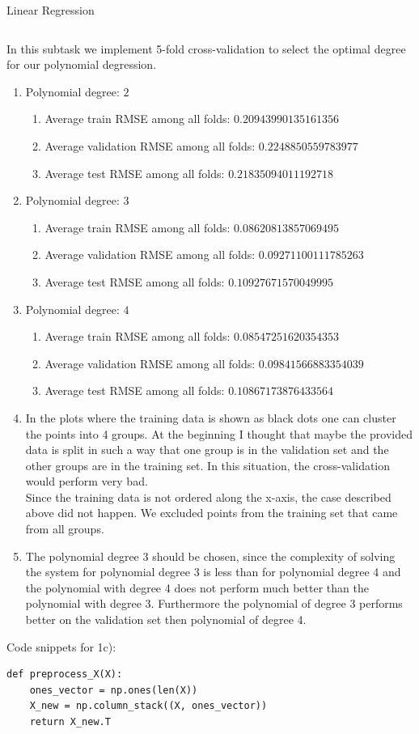 \begin{task}{Linear Regression}
\begin{subtask}
\begin{lstlisting}
\end{lstlisting}
\end{subtask}
\begin{subtask}
In this subtask we implement 5-fold cross-validation to select the optimal degree for our polynomial degression.
\begin{enumerate}
\item Polynomial degree: $2$
\begin{enumerate}
\item Average train RMSE among all folds: $0.20943990135161356$
\item Average validation RMSE among all folds: $0.2248850559783977$
\item Average test RMSE among all folds: $0.21835094011192718$
\end{enumerate}
\item Polynomial degree: $3$
\begin{enumerate}
\item Average train RMSE among all folds: $0.08620813857069495$
\item Average validation RMSE among all folds: $0.09271100111785263$
\item Average test RMSE among all folds: $0.10927671570049995$
\end{enumerate}
\item Polynomial degree: $4$
\begin{enumerate}
\item Average train RMSE among all folds: $0.08547251620354353$
\item Average validation RMSE among all folds: $0.09841566883354039$
\item Average test RMSE among all folds: $0.10867173876433564$
\end{enumerate}
\item In the plots where the training data is shown as black dots one can cluster the points into 4 groups. At the beginning I thought that maybe the provided data is split in such a way that one group is in the validation set and the other groups are in the training set. In this situation, the cross-validation would perform very bad. \\
Since the training data is not ordered along the x-axis, the case described above did not happen. We excluded points from the training set that came from all groups. 
\item The polynomial degree 3 should be chosen, since the complexity of solving the system for polynomial degree 3 is less than for polynomial degree 4 and the polynomial with degree 4 does not perform much better than the polynomial with degree 3. Furthermore the polynomial of degree 3 performs better on the validation set then polynomial of degree 4. 
\end{enumerate}
Code snippets for 1c):
\begin{lstlisting}
def preprocess_X(X):
    ones_vector = np.ones(len(X))
    X_new = np.column_stack((X, ones_vector))
    return X_new.T


\end{lstlisting}
\end{subtask}
\end{task}
